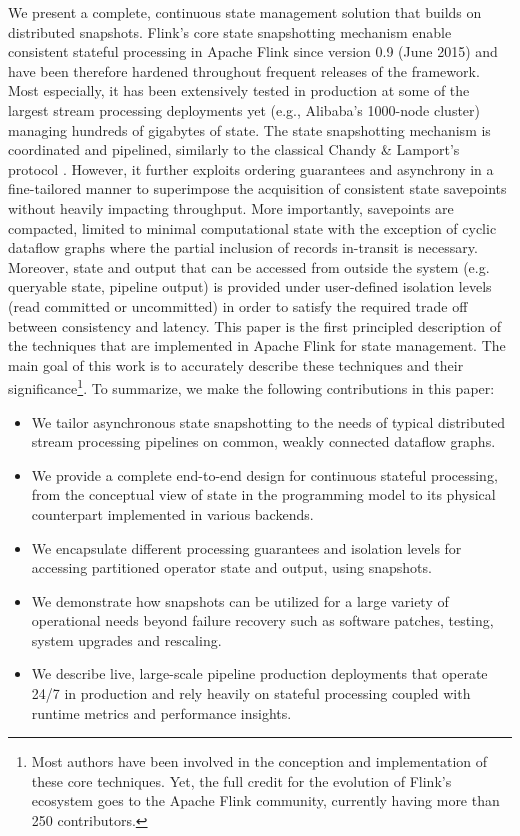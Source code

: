 We present a complete, continuous state management solution that builds on distributed snapshots. Flink's core state snapshotting mechanism enable consistent stateful processing in Apache Flink since version 0.9 (June 2015) and have been therefore hardened throughout frequent releases of the framework. Most especially, it has been extensively tested in production at some of the largest stream processing deployments yet (e.g., Alibaba's 1000-node cluster) managing hundreds of gigabytes of state. The state snapshotting mechanism is coordinated and pipelined, similarly to the classical Chandy \& Lamport's protocol \cite{chandy1985distributed}. However, it further exploits ordering guarantees and asynchrony in a fine-tailored manner to superimpose the acquisition of consistent state savepoints without heavily impacting throughput. More importantly, savepoints are compacted, limited to minimal computational state with the exception of cyclic dataflow graphs where the partial inclusion of records in-transit is necessary. 
Moreover, state and output that can be accessed from outside the system (e.g. queryable state, pipeline output) is provided under user-defined isolation levels (read committed or uncommitted) in order to satisfy the required trade off between consistency and latency. 
This paper is the first principled description of the techniques that are implemented in Apache Flink for state management. The main goal of this work is to accurately describe these techniques and their significance\footnote{Most authors have been involved in the conception and implementation of these core techniques. Yet, the full credit for the evolution of Flink's ecosystem goes to the Apache Flink community, currently having more than 250 contributors.}. To summarize, we make the following contributions in this paper:

\begin{itemize}
	\item We tailor asynchronous state snapshotting to the needs of typical distributed stream processing pipelines on common, weakly connected dataflow graphs.
	\item We provide a complete end-to-end design for continuous stateful processing, from the conceptual view of state in the programming model to its physical counterpart implemented in various backends.
	\item We encapsulate different processing guarantees and isolation levels for accessing partitioned operator state and output, using snapshots.
	\item We demonstrate how snapshots can be utilized for a large variety of operational needs beyond failure recovery such as software patches, testing, system upgrades and rescaling.
	\item We describe live, large-scale pipeline production deployments that operate 24/7 in production and rely heavily on stateful processing coupled with runtime metrics and performance insights.
\end{itemize}

